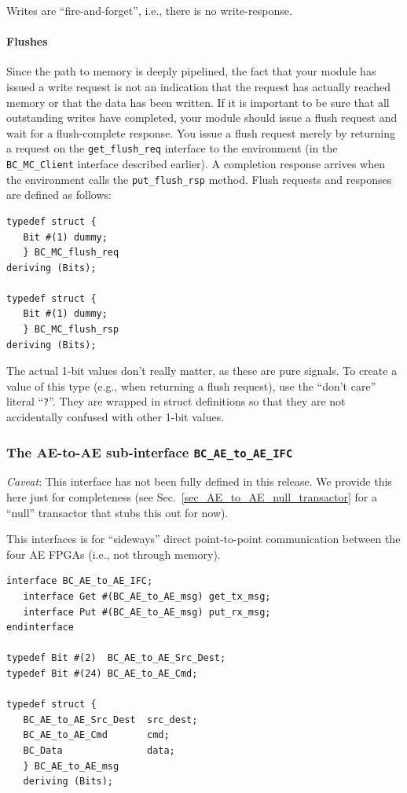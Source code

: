 \documentclass[twoside,letterpaper,11pt]{article}
\newcommand{\hm}{\hspace*{1em}}
\begin{document}
Writes are ``fire-and-forget'', i.e., there is no write-response.


\paragraph{Flushes}
\hm

Since the path to memory is deeply pipelined, the fact that your
module has issued a write request is not an indication that the
request has actually reached memory or that the data has been written.
If it is important to be sure that all outstanding writes have
completed, your module should issue a flush request and wait for a
flush-complete response.  You issue a flush request merely by
returning a request on the \verb|get_flush_req| interface to the
environment (in the \verb|BC_MC_Client| interface described earlier).
A completion response arrives when the environment calls the
\verb|put_flush_rsp| method.  Flush requests and responses are defined as follows:
\begin{Verbatim}[frame=single, label=BC\_HW\_IFC.bsv]
typedef struct {
   Bit #(1) dummy;
   } BC_MC_flush_req
deriving (Bits);

typedef struct {
   Bit #(1) dummy;
   } BC_MC_flush_rsp
deriving (Bits);
\end{Verbatim}
The actual 1-bit values don't really matter, as these are pure
signals.  To create a value of this type (e.g., when returning a flush
request), use the ``don't care'' literal ``\verb|?|''.  They are
wrapped in struct definitions so that they are not accidentally
confused with other 1-bit values.


\subsubsection{The AE-to-AE sub-interface {\tt BC\_AE\_to\_AE\_IFC}}

\label{sec_ae_to_ae_ifc}
 
\emph{Caveat}: This interface has not been fully defined in this
release.  We provide this here just for completeness (see
Sec.~\ref{sec_AE_to_AE_null_transactor} for a ``null'' transactor that
stubs this out for now).

This interfaces is for ``sideways'' direct point-to-point
communication between the four AE FPGAs (i.e., not through memory).
\begin{Verbatim}[frame=single, label=BC\_HW\_IFC.bsv]  
interface BC_AE_to_AE_IFC;
   interface Get #(BC_AE_to_AE_msg) get_tx_msg;
   interface Put #(BC_AE_to_AE_msg) put_rx_msg;
endinterface

typedef Bit #(2)  BC_AE_to_AE_Src_Dest;
typedef Bit #(24) BC_AE_to_AE_Cmd;

typedef struct {
   BC_AE_to_AE_Src_Dest  src_dest;
   BC_AE_to_AE_Cmd       cmd;
   BC_Data               data;
   } BC_AE_to_AE_msg
   deriving (Bits);
\end{Verbatim}
\end{document}
